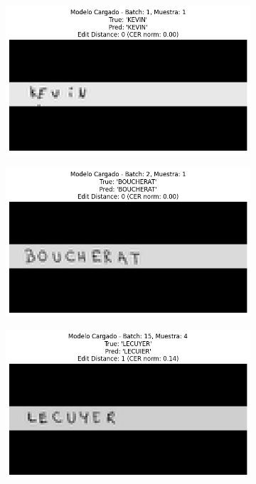 \documentclass[11pt,letterpaper]{article}
\begin{document}
	\begin{figure}[!h]
		\centering
		\begin{subfigure}[b]{0.45\linewidth}
			\centering
			\includegraphics[width=\linewidth]{pred1.jpg}
		\end{subfigure}		
		\begin{subfigure}[b]{0.45\linewidth}
			\centering
			\includegraphics[width=\linewidth]{pred2.jpg}
		\end{subfigure}
		\begin{subfigure}[b]{0.45\linewidth}
			\centering
			\includegraphics[width=\linewidth]{pred3.jpg}

\end{subfigure}
\end{figure}
\end{document}
